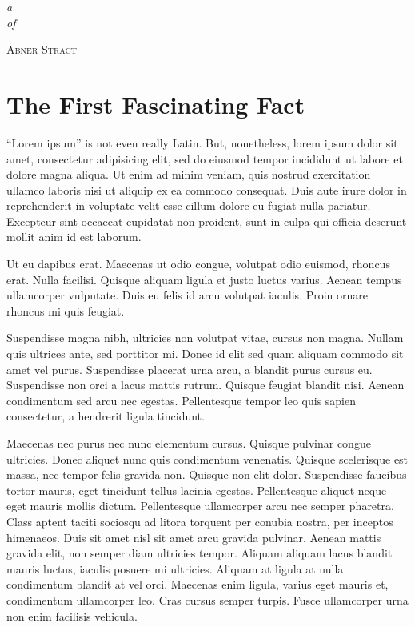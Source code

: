 \documentclass[9pt]{memoir}
\begin{document}
\frontmatter
\thispagestyle{empty}

\mbox{}\vspace{2in}
\noindent
\begin{flushright}
{\LARGE\itshape{}a}\\[2\baselineskip]
{\LARGE\itshape{}of}
\end{flushright}

\vspace{6\baselineskip}
\hfill{\Large\scshape{}Abner Stract}

\cleartorecto\tableofcontents*

\mainmatter

\chapter{The First Fascinating Fact}
``Lorem ipsum'' is not even really Latin. But, nonetheless, lorem ipsum dolor sit amet, consectetur adipisicing elit, sed do eiusmod tempor incididunt ut labore et dolore magna aliqua. Ut enim ad minim veniam, quis nostrud exercitation ullamco laboris nisi ut aliquip ex ea commodo consequat. Duis aute irure dolor in reprehenderit in voluptate velit esse cillum dolore eu fugiat nulla pariatur. Excepteur sint occaecat cupidatat non proident, sunt in culpa qui officia deserunt mollit anim id est laborum.

Ut eu dapibus erat. Maecenas ut odio congue, volutpat odio euismod, rhoncus erat. Nulla facilisi. Quisque aliquam ligula et justo luctus varius. Aenean tempus ullamcorper vulputate. Duis eu felis id arcu volutpat iaculis. Proin ornare rhoncus mi quis feugiat.

Suspendisse magna nibh, ultricies non volutpat vitae, cursus non magna. Nullam quis ultrices ante, sed porttitor mi. Donec id elit sed quam aliquam commodo sit amet vel purus. Suspendisse placerat urna arcu, a blandit purus cursus eu. Suspendisse non orci a lacus mattis rutrum. Quisque feugiat blandit nisi. Aenean condimentum sed arcu nec egestas. Pellentesque tempor leo quis sapien consectetur, a hendrerit ligula tincidunt.

Maecenas nec purus nec nunc elementum cursus. Quisque pulvinar congue ultricies. Donec aliquet nunc quis condimentum venenatis. Quisque scelerisque est massa, nec tempor felis gravida non. Quisque non elit dolor. Suspendisse faucibus tortor mauris, eget tincidunt tellus lacinia egestas. Pellentesque aliquet neque eget mauris mollis dictum. Pellentesque ullamcorper arcu nec semper pharetra. Class aptent taciti sociosqu ad litora torquent per conubia nostra, per inceptos himenaeos. Duis sit amet nisl sit amet arcu gravida pulvinar. Aenean mattis gravida elit, non semper diam ultricies tempor. Aliquam aliquam lacus blandit mauris luctus, iaculis posuere mi ultricies. Aliquam at ligula at nulla condimentum blandit at vel orci. Maecenas enim ligula, varius eget mauris et, condimentum ullamcorper leo. Cras cursus semper turpis. Fusce ullamcorper urna non enim facilisis vehicula.
\end{document}
